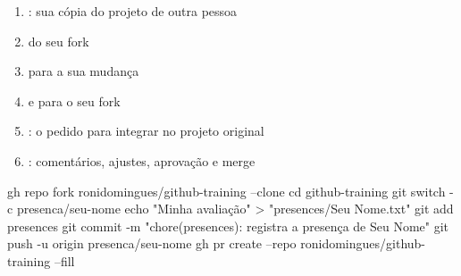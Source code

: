 
\begin{frame}{}
  \vspace{0.8em}
  \begin{enumerate}
    \item {}: sua cópia do projeto de outra pessoa
    \item {} do seu fork
    \item {} para a sua mudança
    \item {} e  para o seu fork
    \item {}: o pedido para integrar no projeto original
    \item {}: comentários, ajustes, aprovação e merge
  \end{enumerate}

  \vspace{1em}
  \begin{center}
  \end{center}

\end{frame}

\begin{frame}[fragile]{}
\begin{sh}
gh repo fork ronidomingues/github-training --clone
cd github-training
git switch -c presenca/seu-nome
echo "Minha avaliação" > "presences/Seu Nome.txt"
git add presences
git commit -m "chore(presences): registra a presença de Seu Nome"
git push -u origin presenca/seu-nome
gh pr create --repo ronidomingues/github-training --fill
\end{sh}

  \begin{center}
  \end{center}

\end{frame}

